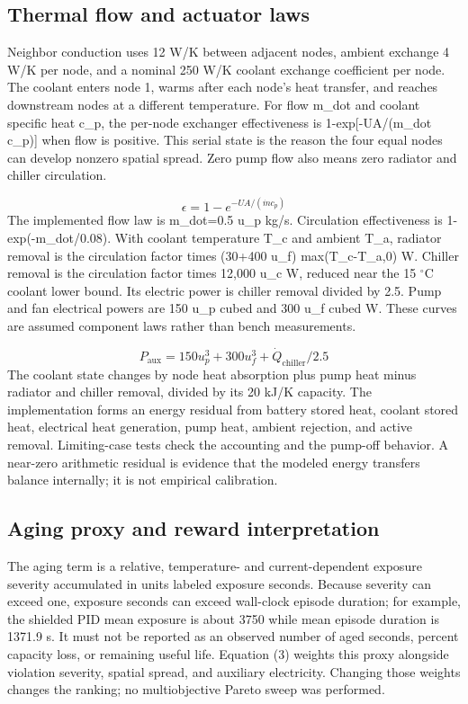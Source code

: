 \documentclass[conference]{IEEEtran}
\begin{document}
\subsection{Thermal flow and actuator laws}
Neighbor conduction uses 12 W/K between adjacent nodes, ambient exchange 4 W/K per node, and a nominal 250 W/K coolant exchange coefficient per node. The coolant enters node 1, warms after each node's heat transfer, and reaches downstream nodes at a different temperature. For flow m\_dot and coolant specific heat c\_p, the per-node exchanger effectiveness is 1-exp[-UA/(m\_dot c\_p)] when flow is positive. This serial state is the reason the four equal nodes can develop nonzero spatial spread. Zero pump flow also means zero radiator and chiller circulation.

\begin{equation}
\epsilon=1-e^{-UA/(\dot m c_p)}
\label{eq:5}
\end{equation}
The implemented flow law is m\_dot=0.5 u\_p kg/s. Circulation effectiveness is 1-exp(-m\_dot/0.08). With coolant temperature T\_c and ambient T\_a, radiator removal is the circulation factor times (30+400 u\_f) max(T\_c-T\_a,0) W. Chiller removal is the circulation factor times 12,000 u\_c W, reduced near the 15 $^{\circ}$C coolant lower bound. Its electric power is chiller removal divided by 2.5. Pump and fan electrical powers are 150 u\_p cubed and 300 u\_f cubed W. These curves are assumed component laws rather than bench measurements.

\begin{equation}
P_{\mathrm{aux}}=150u_p^3+300u_f^3+\dot Q_{\mathrm{chiller}}/2.5
\label{eq:6}
\end{equation}
The coolant state changes by node heat absorption plus pump heat minus radiator and chiller removal, divided by its 20 kJ/K capacity. The implementation forms an energy residual from battery stored heat, coolant stored heat, electrical heat generation, pump heat, ambient rejection, and active removal. Limiting-case tests check the accounting and the pump-off behavior. A near-zero arithmetic residual is evidence that the modeled energy transfers balance internally; it is not empirical calibration.

\subsection{Aging proxy and reward interpretation}
The aging term is a relative, temperature- and current-dependent exposure severity accumulated in units labeled exposure seconds. Because severity can exceed one, exposure seconds can exceed wall-clock episode duration; for example, the shielded PID mean exposure is about 3750 while mean episode duration is 1371.9 s. It must not be reported as an observed number of aged seconds, percent capacity loss, or remaining useful life. Equation (3) weights this proxy alongside violation severity, spatial spread, and auxiliary electricity. Changing those weights changes the ranking; no multiobjective Pareto sweep was performed.
\end{document}
